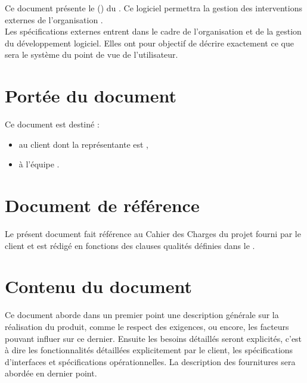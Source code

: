 Ce document présente le \DSE{} (\DSECourt) du \PIC{} \nomPIC. Ce logiciel permettra la gestion des interventions externes de l'organisation \nomClient. \\
	
	Les spécifications externes entrent dans le cadre de l'organisation et de la gestion du développement logiciel. Elles ont pour objectif de décrire exactement ce que sera le système du point de vue de l'utilisateur.
	
	
\section*{Portée du document}
	Ce document est destiné :
	\begin{itemize}
		\item au client \nomClient{} dont la représentante est \representantClient,
		\item à l'équipe \PICCourt{} \nomEquipe.
	\end{itemize}
	
\section*{Document de référence}
	Le présent document fait référence au Cahier des Charges du projet fourni par le client et est rédigé en fonctions des clauses qualités définies dans le \PQ.
	
\section*{Contenu du document}
	Ce document aborde dans un premier point une description générale sur la réalisation du produit, comme le respect des exigences, ou encore, les facteurs pouvant influer sur ce dernier. Ensuite les besoins détaillés seront explicités, c'est à dire les fonctionnalités détaillées  explicitement par le client, les spécifications d'interfaces et spécifications opérationnelles. La description des fournitures sera abordée en dernier point.
